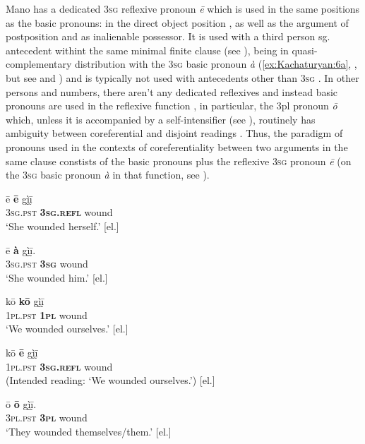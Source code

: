 \documentclass[output=paper]{langscibook}
\begin{document}
Mano has a dedicated \textsc{3sg} reflexive pronoun \textit{ē} which is used in the same positions as the basic pronouns: in the direct object position , as well as the argument of postposition and as inalienable possessor. It is used with a third person sg. antecedent withint the same minimal finite clause (see ), being in quasi-complementary distribution with the \textsc{3sg} basic pronoun \textit{à} (\ref{ex:Kachaturyan:6a}, , but see  and ) and is typically not used with antecedents other than \textsc{3sg} . In other persons and numbers, there aren’t any dedicated reflexives and instead basic pronouns are used in the reflexive function , in particular, the 3pl pronoun \textit{ō} which, unless it is accompanied by a self-intensifier (see ), routinely has ambiguity between coreferential and disjoint readings . Thus, the paradigm of pronouns used in the contexts of coreferentiality between two arguments in the same clause constists of the basic pronouns plus the reflexive \textsc{3sg} pronoun \textit{ē} (on the \textsc{3sg} basic pronoun \textit{à} in that function, see ).


\ea
\label{ex:Kachaturyan:6}
    \ea
    \label{ex:Kachaturyan:6a}  
\gll ē  \textbf{ē}  gḭ̀ḭ̄  ~\\
     \textsc{3sg.pst}  \textbf{\textsc{3sg.refl}}  wound\\
\glt ‘She wounded herself.’ [el.]

\ex
    \label{ex:Kachaturyan:6b}  
\gll ē  \textbf{à}  gḭ̀ḭ̄.  ~\\
     \textsc{3sg.pst}  \textbf{\textsc{3sg}}  wound\\
\glt ‘She wounded him.’ [el.]

\ex
    \label{ex:Kachaturyan:6c}  
\gll kō  \textbf{kō}  gḭ̀ḭ̄  ~\\
     \textsc{1pl.pst}  \textbf{\textsc{1pl}}  wound\\
\glt ‘We wounded ourselves.’ [el.]

\ex
    \label{ex:Kachaturyan:6d}  
\gll *kō  \textbf{ē}  gḭ̀ḭ̄\\
     \textsc{1pl.pst}  \textbf{\textsc{3sg.refl}}  wound\\
\glt (Intended reading: ‘We wounded ourselves.’) [el.]

\ex
    \label{ex:Kachaturyan:6e}  
\gll ō  \textbf{ō}  gḭ̀ḭ̄.~\\
     \textsc{3pl.pst}  \textbf{\textsc{3pl}}  wound\\
\glt ‘They wounded themselves/them.’ [el.]\z
\z
\end{document}
